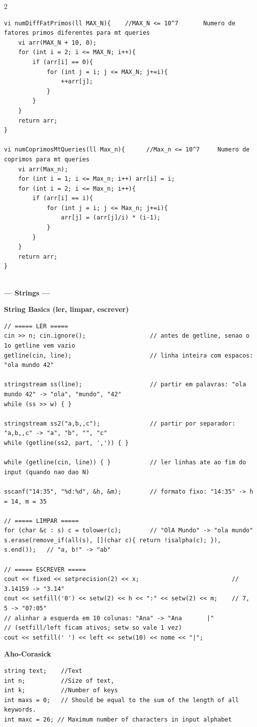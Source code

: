 \documentclass{article}
\begin{document}
\begin{multicols}{2}
\begin{lstlisting}
vi numDiffFatPrimos(ll MAX_N){    //MAX_N <= 10^7       Numero de fatores primos diferentes para mt queries
	vi arr(MAX_N + 10, 0);
	for (int i = 2; i <= MAX_N; i++){
		if (arr[i] == 0){
			for (int j = i; j <= MAX_N; j+=i){
				++arr[j];
			}
		}
	}
	return arr;
}

vi numCoprimosMtQueries(ll Max_n){      //Max_n <= 10^7     Numero de coprimos para mt queries
	vi arr(Max_n);
	for (int i = 1; i <= Max_n; i++) arr[i] = i;
	for (int i = 2; i <= Max_n; i++){
		if (arr[i] == i){
			for (int j = i; j <= Max_n; j+=i){
				arr[j] = (arr[j]/i) * (i-1);
			}
		}
	}
	return arr;
}
	
\end{lstlisting}

\large
\begin{center}
\huge\textbf{--- Strings ---}
\end{center}
\large

\large
\Large\textbf{String Basics (ler, limpar, escrever)}
\large
\begin{lstlisting}
// ===== LER =====
cin >> n; cin.ignore();                  // antes de getline, senao o 1o getline vem vazio
getline(cin, line);                      // linha inteira com espacos: "ola mundo 42"

stringstream ss(line);                   // partir em palavras: "ola mundo 42" -> "ola", "mundo", "42"
while (ss >> w) { }

stringstream ss2("a,b,,c");              // partir por separador: "a,b,,c" -> "a", "b", "", "c"
while (getline(ss2, part, ',')) { }

while (getline(cin, line)) { }           // ler linhas ate ao fim do input (quando nao dao N)

sscanf("14:35", "%d:%d", &h, &m);        // formato fixo: "14:35" -> h = 14, m = 35

// ===== LIMPAR =====
for (char &c : s) c = tolower(c);        // "OlA Mundo" -> "ola mundo"
s.erase(remove_if(all(s), [](char c){ return !isalpha(c); }), s.end());   // "a, b!" -> "ab"

// ===== ESCREVER =====
cout << fixed << setprecision(2) << x;                          // 3.14159 -> "3.14"
cout << setfill('0') << setw(2) << h << ":" << setw(2) << m;    // 7, 5 -> "07:05"
// alinhar a esquerda em 10 colunas: "Ana" -> "Ana       |"
// (setfill/left ficam ativos; setw so vale 1 vez)
cout << setfill(' ') << left << setw(10) << nome << "|";
\end{lstlisting}

\large
\Large\textbf{Aho-Corasick}
\large
\begin{lstlisting}
string text;    //Text
int n;          //Size of text,
int k;          //Number of keys
int maxs = 0;   // Should be equal to the sum of the length of all keywords.
int maxc = 26; // Maximum number of characters in input alphabet


\end{lstlisting}
\end{multicols}
\end{document}
